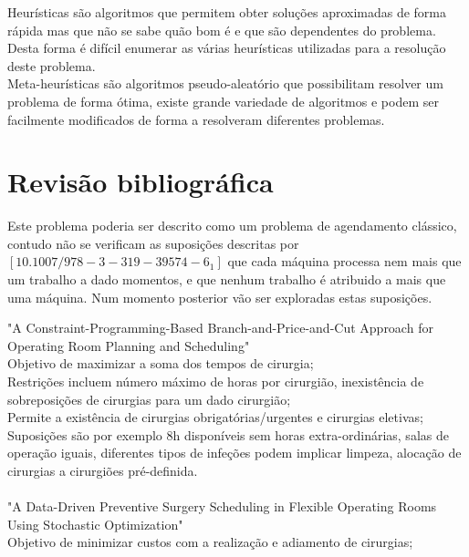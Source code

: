 Heurísticas são algoritmos que permitem obter soluções aproximadas de forma rápida mas que não se sabe quão bom é e que são dependentes do problema. Desta forma é difícil enumerar as várias heurísticas utilizadas para a resolução deste problema.\\
Meta-heurísticas são algoritmos pseudo-aleatório que possibilitam resolver um problema de forma ótima, existe grande variedade de algoritmos e podem ser facilmente modificados de forma a resolveram diferentes problemas.\\












\section{Revisão bibliográfica}
\label{sec:rev_bib}

Este problema poderia ser descrito como um problema de agendamento clássico, contudo não se verificam as suposições descritas por $[10.1007/978-3-319-39574-6_1]$ que cada máquina processa nem mais que um trabalho a dado momentos, e que nenhum trabalho é atribuido a mais que uma máquina. Num momento posterior vão ser exploradas estas suposições.



"A Constraint-Programming-Based Branch-and-Price-and-Cut Approach for  Operating Room Planning and Scheduling"\\ %
Objetivo de maximizar a soma dos tempos de cirurgia;\\
Restrições incluem número máximo de horas por cirurgião, inexistência de sobreposições de cirurgias para um dado cirurgião;\\
Permite a existência de cirurgias obrigatórias/urgentes e cirurgias eletivas;\\
Suposições são por exemplo 8h disponíveis sem horas extra-ordinárias, salas de operação iguais, diferentes tipos de infeções podem implicar limpeza, alocação de cirurgias a cirurgiões pré-definida.\\\\

"A Data-Driven Preventive Surgery Scheduling in Flexible Operating Rooms Using Stochastic Optimization"\\ %
Objetivo de minimizar custos com a realização e adiamento de cirurgias;\\\\

